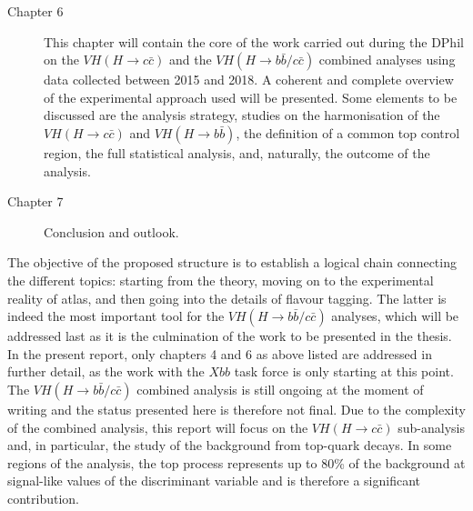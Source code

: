 \begin{description}
\item[Chapter 6] This chapter will contain the core of the work carried out during the DPhil on the $VH (H \rightarrow c\bar{c})$ and the $VH (H \rightarrow b\bar{b}/c\bar{c})$ combined analyses using data collected between 2015 and 2018. A coherent and complete overview of the experimental approach used will be presented. Some elements to be discussed are the analysis strategy, studies on the harmonisation of the $VH (H \rightarrow c\bar{c})$ and $VH (H \rightarrow b\bar{b})$, the definition of a common top control region, the full statistical analysis, and, naturally, the outcome of the analysis. \\  \vspace{-15pt}
\item[Chapter 7] Conclusion and outlook.  \\
\end{description}

The objective of the proposed structure is to establish a logical chain connecting the different topics: starting from the theory, moving on to the experimental reality of \gls{atlas}, and then going into the details of flavour tagging. The latter is indeed the most important tool for the $VH (H \rightarrow b\bar{b}/c\bar{c})$ analyses, which will be addressed last as it is the culmination of the work to be presented in the thesis. In the present report, only chapters 4 and 6 as above listed are addressed in further detail, as the work with the $Xbb$ task force is only starting at this point. The $VH (H \rightarrow b\bar{b}/c\bar{c})$ combined analysis is still ongoing at the moment of writing and the status presented here is therefore not final. Due to the complexity of the combined analysis, this report will focus on the $VH (H \rightarrow c\bar{c})$ sub-analysis and, in particular, the study of the background from top-quark decays. In some regions of the analysis, the top process represents up to 80\% of the background at signal-like values of the discriminant variable and is therefore a significant contribution.
